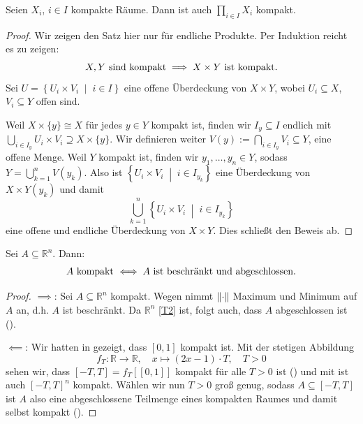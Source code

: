 \documentclass[
12pt, 
openany, 
a4paper, 
final,
fleqn, 
]{myclass}
\numberwithin{equation}{chapter}
\numberwithin{section}{chapter}
\newcommand{\RR}{\mathbb R}
\newcommand{\union}{\bigcup}
\newcommand{\intersect}{\bigcap}
\newcommand{\set}[2]{\left\{#1\;\middle|\;#2\right\}}
\DeclarePairedDelimiter{\norm}{\lVert}{\rVert}
\begin{document}
\begin{thr}[Tychonoff]\label{SatzB}
Seien $X_{i}$, $ i\in I $ kompakte Räume. Dann ist auch $ \prod_{i\in I}X_{i} $ kompakt. 
\end{thr}
\begin{proof}
Wir zeigen den Satz hier nur für endliche Produkte. Per Induktion reicht es zu zeigen: 
\begin{equation}\label{behTych}
\text{$ X, Y $ sind kompakt}\implies X\times Y \text{ ist kompakt}. 
\end{equation}
Sei $ U=\set{U_{i}\times V_{i}}{i\in I} $ eine offene Überdeckung von $ X\times Y $, wobei $U_{i}\subseteq X $, $ V_{i}\subseteq Y $ offen sind.

Weil $ X\times \{y\} \cong X $ für jedes $ y\in Y $ kompakt ist, finden wir $ I_{y}\subseteq I $ endlich mit $ \union_{i\in I_{y}}U_{i}\times V_{i} \supseteq X\times \{y\} $. Wir definieren weiter $ V(y):= \intersect_{i\in I_{y}} V_{i}\subseteq Y $, eine offene Menge. Weil $ Y $ kompakt ist, finden wir $ y_{1},\dots,y_{n}\in Y $, sodass $ Y= \union_{k=1}^{n}V(y_{k}) $. Also ist
$\set{U_{i}\times V_{i}}{i\in I_{y_{k}}}${ eine Überdeckung von $ X\times Y(y_{k}) $}
und damit 
\[
\union_{k=1}^{n}\set{U_{i}\times V_{i}}{i\in I_{y_{k}}}
\]
eine offene und endliche Überdeckung von $ X\times Y $. Dies schließt den Beweis ab. 
\end{proof}
\begin{cor}\label{4.13Kim}
Sei $A\subseteq \RR^n$. Dann: 
\begin{equation}\label{HBorel}
\text{$ A $ kompakt $ \iff A$ ist beschränkt und abgeschlossen.}
\end{equation}
\end{cor}
\begin{proof}
\glqq$\implies$\grqq: Sei $A\subseteq \RR^n$ kompakt. Wegen  nimmt $\norm{\cdot}$ Maximum und Minimum auf $A$ an, d.h. $A$ ist beschränkt. Da $\RR^n$ \ref{T2} ist, folgt auch, dass $A$ abgeschlossen ist ().

\glqq$\impliedby$\grqq: Wir hatten in  gezeigt, dass $[0,1]$ kompakt ist. Mit der stetigen Abbildung 
\[
f_{T}: \RR\to \RR, \quad x\mapsto (2x -1)\cdot T, \quad T>0
\]
sehen wir, dass $[-T, T]= f_T[[0,1]]$ kompakt für alle $T>0$ ist () und mit  ist auch $ [-T, T]^{n} $ kompakt. Wählen wir nun $T>0$ groß genug, sodass $ A\subseteq [-T, T] $ ist $A$ also eine abgeschlossene Teilmenge eines kompakten Raumes und damit selbst kompakt ().
\end{proof}
\end{document}
